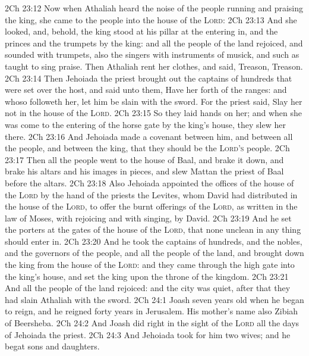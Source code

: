 \vs 2Ch 23:12 Now when Athaliah heard the noise of the people running and praising the king, she came to the people into the house of the \textsc{Lord}:
\vs 2Ch 23:13 And she looked, and, behold, the king stood at his pillar at the entering in, and the princes and the trumpets by the king: and all the people of the land rejoiced, and sounded with trumpets, also the singers with instruments of musick, and such as taught to sing praise. Then Athaliah rent her clothes, and said, Treason, Treason.
\vs 2Ch 23:14 Then Jehoiada the priest brought out the captains of hundreds that were set over the host, and said unto them, Have her forth of the ranges: and whoso followeth her, let him be slain with the sword. For the priest said, Slay her not in the house of the \textsc{Lord}.
\vs 2Ch 23:15 So they laid hands on her; and when she was come to the entering of the horse gate by the king's house, they slew her there.
\vs 2Ch 23:16 And Jehoiada made a covenant between him, and between all the people, and between the king, that they should be the \textsc{Lord's} people.
\vs 2Ch 23:17 Then all the people went to the house of Baal, and brake it down, and brake his altars and his images in pieces, and slew Mattan the priest of Baal before the altars.
\vs 2Ch 23:18 Also Jehoiada appointed the offices of the house of the \textsc{Lord} by the hand of the priests the Levites, whom David had distributed in the house of the \textsc{Lord}, to offer the burnt offerings of the \textsc{Lord}, as  written in the law of Moses, with rejoicing and with singing,  by David.
\vs 2Ch 23:19 And he set the porters at the gates of the house of the \textsc{Lord}, that none  unclean in any thing should enter in.
\vs 2Ch 23:20 And he took the captains of hundreds, and the nobles, and the governors of the people, and all the people of the land, and brought down the king from the house of the \textsc{Lord}: and they came through the high gate into the king's house, and set the king upon the throne of the kingdom.
\vs 2Ch 23:21 And all the people of the land rejoiced: and the city was quiet, after that they had slain Athaliah with the sword.
\vs 2Ch 24:1 Joash  seven years old when he began to reign, and he reigned forty years in Jerusalem. His mother's name also  Zibiah of Beersheba.
\vs 2Ch 24:2 And Joash did  right in the sight of the \textsc{Lord} all the days of Jehoiada the priest.
\vs 2Ch 24:3 And Jehoiada took for him two wives; and he begat sons and daughters.
